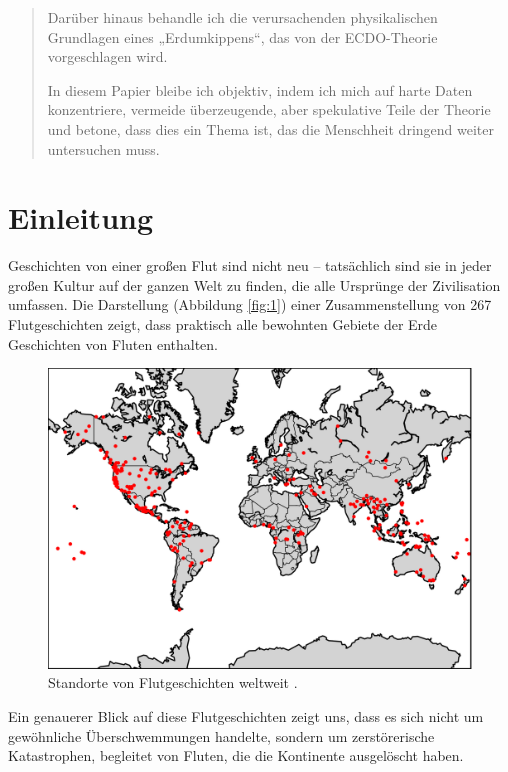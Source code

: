 \documentclass[10pt,twocolumn,letterpaper]{article}
\begin{document}
\begin{abstract}
Darüber hinaus behandle ich die verursachenden physikalischen Grundlagen eines „Erdumkippens“, das von der ECDO-Theorie vorgeschlagen wird.

In diesem Papier bleibe ich objektiv, indem ich mich auf harte Daten konzentriere, vermeide überzeugende, aber spekulative Teile der Theorie und betone, dass dies ein Thema ist, das die Menschheit dringend weiter untersuchen muss.
\end{abstract}

\section{Einleitung}

Geschichten von einer großen Flut sind nicht neu – tatsächlich sind sie in jeder großen Kultur auf der ganzen Welt zu finden, die alle Ursprünge der Zivilisation umfassen. Die Darstellung (Abbildung \ref{fig:1}) einer Zusammenstellung von 267 Flutgeschichten \cite{3} zeigt, dass praktisch alle bewohnten Gebiete der Erde Geschichten von Fluten enthalten.

\begin{figure}[h]
\begin{center}
   \includegraphics[width=1\linewidth]{b.png}
\end{center}
   \caption{Standorte von Flutgeschichten weltweit \cite{3}.}
\label{fig:1}
\label{fig:onecol}
\end{figure}

Ein genauerer Blick auf diese Flutgeschichten zeigt uns, dass es sich nicht um gewöhnliche Überschwemmungen handelte, sondern um zerstörerische Katastrophen, begleitet von Fluten, die die Kontinente ausgelöscht haben.
\end{document}
